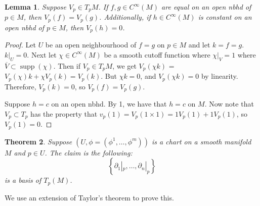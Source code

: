 \documentclass{article}
\newtheorem{theorem}{Theorem}
\newtheorem{lemma}[theorem]{Lemma}
\theoremstyle{definition}
\numberwithin{theorem}{section}
\numberwithin{equation}{section}
\DeclareMathOperator{\supp}{supp}
\begin{document}
\begin{lemma}
	Suppose $V_p \in T_p M$. If $f, g \in C^{\infty}(M)$ are equal on an open nbhd of $p \in M$, then $V_p(f) = V_p(g)$. Additionally, if $h \in C^\infty(M)$ is constant on an open nbhd of $p \in M$, then $V_p (h) = 0$. 
\end{lemma}

\begin{proof}
	Let $U$ be an open neighbourhood of $f = g$ on $p \in M$ and let $k = f = g$. $k|_{U} = 0$. Next let $\chi \in C^\infty(M)$ be a smooth cutoff function where $\chi|_V = 1$ where $\overline{V} \subset \supp(\chi)$.
	Then if $V_p \in T_p M$, we get $V_p(\chi k)$ = $V_p (\chi) k + \chi V_p(k) = V_p(k)$. But $\chi k = 0$, and $V_p (\chi k) = 0$ by linearity. Therefore, $V_p(k) = 0$, so $V_p(f) = V_p(g)$. 

	Suppose $h = c$ on an open nbhd. By 1, we have that $h = c$ on $M$. Now note that $V_p \subset T_p$ has the property that $v_p(1) = V_p(1 \times 1) = 1 V_p(1) + 1 V_p(1)$, so $V_p(1) = 0$.
\end{proof}

\begin{theorem}
	Suppose $(U, \phi = (\phi^1, \ldots, \phi^m))$ is a chart on a smooth manifold $M$ and $p \in U$. The claim is the following:
	\begin{equation}
		\left\{
			\partial_1|_p, \ldots, \partial_n|_p
		\right\}
	\end{equation}
	is a basis of $T_p(M)$. 
\end{theorem}

We use an extension of Taylor's theorem to prove this. 
\end{document}
